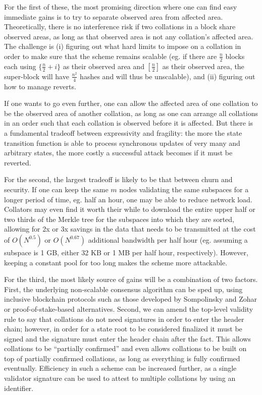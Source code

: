 \documentclass[11pt,a4paper]{article}
\theoremstyle{plain}
\theoremstyle{definition}
\theoremstyle{remark}
\begin{document}
For the first of these, the most promising direction where one can find easy immediate gains is to try to separate observed area from affected area. Theoretically, there is no interference risk if two collations in a block share observed areas, as long as that observed area is not any collation's affected area. The challenge is (i) figuring out what hard limits to impose on a collation in order to make sure that the scheme remains scalable (eg. if there are $\frac{n}{2}$ blocks each using $\{\frac{n}{2}+i\}$ as their observed area and $[\frac{n}{2}]$ as their observed area, the super-block will have $\frac{n^2}{4}$ hashes and will thus be unscalable), and (ii) figuring out how to manage reverts.

If one wants to go even further, one can allow the affected area of one collation to be the observed area of another collation, as long as one can arrange all collations in an order such that each collation is observed before it is affected. But there is a fundamental tradeoff between expressivity and fragility: the more the state transition function is able to process synchronous updates of very many and arbitrary states, the more costly a successful attack becomes if it must be reverted.

For the second, the largest tradeoff is likely to be that between churn and security. If one can keep the same $m$ nodes validating the same subspaces for a longer period of time, eg. half an hour, one may be able to reduce network load. Collators may even find it worth their while to download the entire upper half or two thirds of the Merkle tree for the subspaces into which they are sorted, allowing for 2x or 3x savings in the data that needs to be transmitted at the cost of $O(N^{0.5})$ or $O(N^{0.67})$ additional bandwidth per half hour (eg. assuming a subspace is 1 GB, either 32 KB or 1 MB per half hour, respectively). However, keeping a constant pool for too long makes the scheme more attackable.

For the third, the most likely source of gains will be a combination of two factors. First, the underlying non-scalable consensus algorithm can be sped up, using inclusive blockchain protocols such as those developed by Sompolinsky and Zohar\cite{inclusive} or proof-of-stake-based alternatives. Second, we can amend the top-level validity rule to say that collations do not need signatures in order to enter the header chain; however, in order for a state root to be considered finalized it must be signed and the signature must enter the header chain after the fact. This allows collations to be ``partially confirmed'' and even allows collations to be built on top of partially confirmed collations, as long as everything is fully confirmed eventually. Efficiency in such a scheme can be increased further, as a single validator signature can be used to attest to multiple collations by using an identifier.
\end{document}
